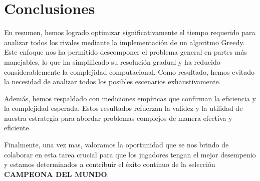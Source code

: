 \section{Conclusiones}

En resumen, hemos logrado optimizar significativamente el tiempo requerido para analizar todos los rivales mediante la implementación de un algoritmo Greedy. Este enfoque nos ha permitido descomponer el problema general en partes más manejables, lo que ha simplificado su resolución gradual y ha reducido considerablemente la complejidad computacional. Como resultado, hemos evitado la necesidad de analizar todos los posibles escenarios exhaustivamente.


Además, hemos respaldado con mediciones empíricas que confirman la eficiencia y la complejidad esperada. Estos resultados refuerzan la validez y la utilidad de nuestra estrategia para abordar problemas complejos de manera efectiva y eficiente.


Finalmente, una vez mas, valoramos la oportunidad que se nos brindo de colaborar en esta tarea crucial para que los jugadores tengan el mejor desempenio y estamos determinados a contribuir el éxito continuo de la selección \textbf{CAMPEONA DEL MUNDO}.



